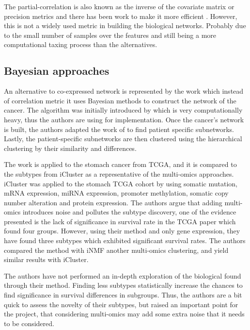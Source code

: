 The partial-correlation is also known as the inverse of the covariate matrix or precision metrics and there has been work to make it more efficient \citet{Ghanbari2019-tq}. However, this is not a widely used metric in building the biological networks. Probably due to the small number of samples over the features and still being a more computational taxing process than the alternatives.

\subsection{Bayesian approaches} \label{s:lit:bayesian}

An alternative to co-expressed network is represented by the work \citet{Nakazawa2021-yq} which instead of correlation metric it uses Bayesian methods to construct the network of the cancer. The algorithm was initially introduced by \citet{Imoto2001-uc} which is very computationally heavy, thus the authors are using \citet{Tamada2011-ok} for implementation. Once the cancer’s network is built, the authors adapted the work of \citet{Tanaka2020-mw} to find patient specific subnetworks. Lastly, the patient-specific subnetworks are then clustered using the hierarchical clustering by their similarity and differences.

The work is applied to the stomach cancer from TCGA, and it is compared to the subtypes from iCluster \citet{Shen2009-ew} as a representative of the multi-omics approaches. iCluster was applied to the stomach TCGA cohort by \citet{Cancer_Genome_Atlas_Research_Network2014-xp} using somatic mutation, mRNA expression, miRNA expression, promoter methylation, somatic copy number alteration and protein expression. The authors \citet{Nakazawa2021-yq} argue that adding multi-omics introduces noise and pollutes the subtype discovery, one of the evidence presented is the lack of significance in survival rate in the TCGA paper \citet{Cancer_Genome_Atlas_Research_Network2014-xp} which found four groups. However, using their method and only gene expression, they have found three subtypes which exhibited significant survival rates. The authors compared the method with iNMF \citet{Yang2016-dm} another multi-omics clustering, and yield similar results with iCluster.

The authors have not performed an in-depth exploration of the biological found through their method. Finding less subtypes statistically increase the chances to find significance in survival differences in subgroups. Thus, the authors are a bit quick to assess the novelty of their subtypes, but raised an important point for the project, that considering multi-omics may add some extra noise that it needs to be considered.

